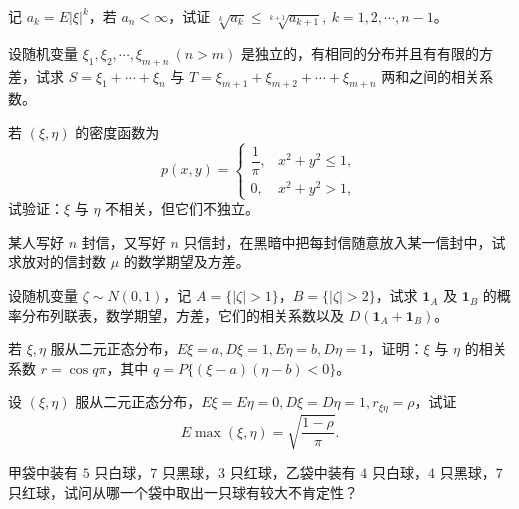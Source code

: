 \documentclass[../../main.tex]{subfiles}
\begin{document}
\begin{exercise}\label{exercise:ch04-29}
记 $a_k=E|\xi|^k$，若 $a_n<\infty$，试证 $\sqrt[k]{a_k}\leqslant\sqrt[k+1]{a_{k+1}},\ k=1,2,\cdots,n-1$。
\end{exercise}

\begin{exercise}\label{exercise:ch04-30}
设随机变量 $\xi_1,\xi_2,\cdots,\xi_{m+n}\ (n>m)$ 是独立的，有相同的分布并且有有限的方差，试求 $S=\xi_1+\cdots+\xi_n$ 与 $T=\xi_{m+1}+\xi_{m+2}+\cdots+\xi_{m+n}$ 两和之间的相关系数。
\end{exercise}

\begin{exercise}\label{exercise:ch04-31}
若 $(\xi,\eta)$ 的密度函数为
\[
p(x,y)=\begin{cases}
\dfrac{1}{\pi},&x^2+y^2\leqslant 1,\\
0,&x^2+y^2>1,
\end{cases}
\]
试验证：$\xi$ 与 $\eta$ 不相关，但它们不独立。
\end{exercise}

\begin{exercise}\label{exercise:ch04-32}
某人写好 $n$ 封信，又写好 $n$ 只信封，在黑暗中把每封信随意放入某一信封中，试求放对的信封数 $\mu$ 的数学期望及方差。
\end{exercise}

\begin{exercise}\label{exercise:ch04-33}
设随机变量 $\zeta\sim N(0,1)$，记 $A=\{|\zeta|>1\}$，$B=\{|\zeta|>2\}$，试求 $\mathbf{1}_A$ 及 $\mathbf{1}_B$ 的概率分布列联表，数学期望，方差，它们的相关系数以及 $D(\mathbf{1}_A+\mathbf{1}_B)$。
\end{exercise}

\begin{exercise}\label{exercise:ch04-34}
若 $\xi,\eta$ 服从二元正态分布，$E\xi=a,D\xi=1,E\eta=b,D\eta=1$，证明：$\xi$ 与 $\eta$ 的相关系数 $r=\cos q\pi$，其中 $q=P\{(\xi-a)(\eta-b)<0\}$。
\end{exercise}

\begin{exercise}\label{exercise:ch04-35}
设 $(\xi,\eta)$ 服从二元正态分布，$E\xi=E\eta=0,D\xi=D\eta=1,r_{\xi\eta}=\rho$，试证
\[
E\max(\xi,\eta)=\sqrt{\frac{1-\rho}{\pi}}.
\]
\end{exercise}

\begin{exercise}\label{exercise:ch04-36}
甲袋中装有 $5$ 只白球，$7$ 只黑球，$3$ 只红球，乙袋中装有 $4$ 只白球，$4$ 只黑球，$7$ 只红球，试问从哪一个袋中取出一只球有较大不肯定性？
\end{exercise}
\end{document}
